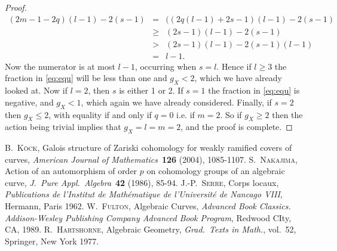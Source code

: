 \documentclass[11pt]{article} %
\begin{document}
\begin{proof}
      \begin{eqnarray*}
	(2m-1-2q)(l-1)-2(s-1) & = & ((2q(l-1)+2s-1)(l-1)-2(s-1) \\
	& \geq & (2s-1)(l-1)-2(s-1) \\
	& > & (2s-1)(l-1)-2(s-1)(l-1) \\
	& = & l-1.
      \end{eqnarray*}
    Now the numerator is at most $l-1$, occurring when $s=l$. 
    Hence if $l\geq 3$ the fraction in \eqref{eq:equ} will be less than one and $g_X < 2$, which we have already looked at.
    Now if $l=2$, then $s$ is either 1 or 2.
    If $s=1$ the fraction in \eqref{eq:equ} is negative, and $g_X<1$, which again we have already considered.
    Finally, if $s=2$ then $g_X\leq 2$, with equality if and only if $q=0$ i.e. if $m=2$.
    So if $g_X \geq 2$ then the action being trivial implies that $g_X=l=m=2$, and the proof is complete.    
  \end{proof}


\begin{thebibliography}
   \textsc{B.~K\"ock}, Galois
    structure  of
    Zariski cohomology for weakly ramified covers of curves,
    \textit{American Journal of Mathematics}~\textbf{126} (2004),
    1085-1107.
 \textsc{S.\ Nakajima}, Action of an
    automorphism of order $p$ on cohomology groups of an
    algebraic curve, \textit{J.\ Pure Appl.\ Algebra}~\textbf{42}
    (1986), 85-94.
 \textsc{J.-P.~Serre}, Corps locaux, \textit{
    Publications de l'Institut de Math\'ematique de l'Universit\'e de
  Nancago VIII}, Hermann, Paris 1962.
 \textsc{W.\ Fulton}, Algebraic Curves, 
    \textit{Advanced Book Classics. Addison-Wesley Publishing 
    Company Advanced Book Program}, Redwood CIty, CA, 1989.
 \textsc{R.~Hartshorne}, Algebraic
    Geometry, \textit{Grad.\ Texts in Math.}, vol.~52, Springer, New York 1977.
\end{thebibliography}
\end{document}
